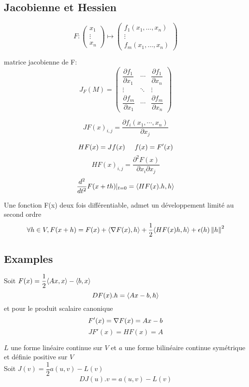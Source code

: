 \subsection{Jacobienne et Hessien}
$$
F :
\begin{pmatrix}
	x_1\\\vdots\\x_n
\end{pmatrix} 
\longmapsto 
\begin{pmatrix}
f_1(x_1,\dots,x_n)\\
\vdots\\
f_m(x_1,\dots,x_n)
\end{pmatrix}
$$

matrice jacobienne de F:
$$
J_F\left(M\right)=
\begin{pmatrix} 
\dfrac{\partial f_1}{\partial x_1} & \cdots & \dfrac{\partial f_1}{\partial x_n} \\
\vdots & \ddots & \vdots \\
\dfrac{\partial f_m}{\partial x_1} & \cdots & \dfrac{\partial f_m}{\partial x_n}
\end{pmatrix}
$$

$$
JF(x)_{i,j} = \frac{\partial  f_i(x_1, \cdots, x_n)}{\partial x_j}
$$

$$
HF(x) = Jf(x) \hspace{0.5cm} f(x) = F'(x)
$$
$$
HF(x)_{i,j} = \frac{\partial ^2 F(x)}{\partial x_i \partial  x_j}
$$
$$
\frac{d^2}{d t^2}F(x+th)|_{t=0} = \langle HF(x).h , h\rangle
$$

\begin{proposition}
Une fonction F(x) deux fois diff\'erentiable, admet un d\'eveloppement limit\'e au second ordre
$$ \forall h \in V, F(x+h) = F(x) + \langle \nabla F(x) , h\rangle + \frac{1}{2}\langle HF(x)h , h\rangle + \epsilon(h)\left\Vert h\right\Vert^2 $$
\end{proposition}

\subsection{Examples}
\begin{example}
Soit $F(x) = \dfrac{1}{2}\langle Ax , x\rangle - \langle b , x\rangle$
$$DF(x).h = \langle Ax-b , h\rangle$$
et pour le produit scalaire canonique
$$
F'(x) = \nabla F(x) = Ax - b
$$
$$JF'(x) = HF(x) = A$$
\end{example}

\begin{example}
$L$ une forme lin\'eaire continue sur $V$  et $a$  une forme bilin\'eaire continue sym\'etrique et d\'efinie positive sur $V$ \\
Soit $J(v) = \dfrac{1}{2}a(u,v) - L(v)$
$$
DJ(u).v = a(u,v) - L(v)
$$
\end{example}

